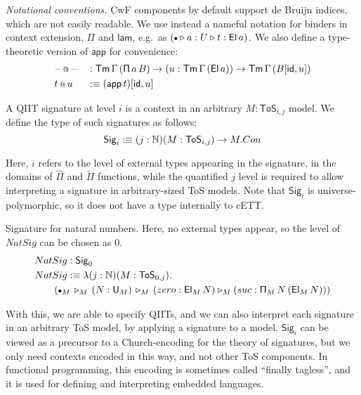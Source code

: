 \documentclass{llncs}
\makeatletter
\newcommand{\ToS}{\mathsf{ToS}}
\newcommand{\ext}{\triangleright}
\newcommand{\emptycon}{\scaleobj{.75}\bullet}
\newcommand{\Pii}{\mathsf{\Pi}}
\newcommand{\appi}{\mathsf{app}}
\newcommand{\lami}{\mathsf{lam}}
\newcommand{\Pie}{\mathsf{\hat{\Pi}}}
\newcommand{\Piinf}{\mathsf{\tilde{\Pi}}}
\newcommand{\appitt}{\mathop{{\scriptstyle @}}}
\newcommand{\Sig}{\mathsf{Sig}}
\makeatother
\begin{document}
\emph{Notational conventions.} CwF components by default support de Bruijn
indices, which are not easily readable. We use instead a nameful notation for
binders in context extension, $\Pii$ and $\lami$, e.g.\ as $(\emptycon \ext a :
U \ext t : \El\,a)$. We also define a type-theoretic version of $\appi$ for
convenience:
\begin{alignat*}{3}
  & \blank\appitt\blank && :
      \Tm\,\Gamma\,(\Pii\,a\,B)\ra
      (u : \Tm\,\Gamma\,(\El\,a)) \ra \Tm\,\Gamma\,(B[\id, u])\\
  & t\appitt u && :\equiv (\appi\,t)[\id, u]
\end{alignat*}

\begin{nidefinition}
A QIIT signature at level $i$ is a context in an arbitrary $M : \ToS_{i,j}$
model. We define the type of such signatures as follows:
\[
  \Sig_i :\equiv (j : \mathbb{N})(M : \ToS_{i,j})\ra M.Con
\]

Here, $i$ refers to the level of external types appearing in the signature, in
the domains of $\Pie$ and $\Piinf$ functions, while the quantified $j$ level is
required to allow interpreting a signature in arbitrary-sized ToS models. Note
that $\Sig_i$ is universe-polymorphic, so it does not have a type internally to
cETT.

\begin{example}{
    Signature for natural numbers. Here, no external types appear, so the level
    of $NatSig$ can be chosen as $0$.}
\begin{alignat*}{3}
  & NatSig : \Sig_0 \\
  & NatSig :\equiv \lambda (j :\mathbb{N})(M : \ToS_{0,j}).\\
  & \hspace{2em}(\emptycon_M\,\ext_M\, (N : \U_M) \,\ext_M\, (zero : \El_M\,N) \ext_M (suc : \Pii_M\,N\,(\El_M\,N)))
\end{alignat*}
\end{example}

With this, we are able to specify QIITs, and we can also interpret each
signature in an arbitrary ToS model, by applying a signature to a model.
$\Sig_i$ can be viewed as a precursor to a Church-encoding for the theory of
signatures, but we only need contexts encoded in this way, and not other ToS
components. In functional programming, this encoding is sometimes called
``finally tagless''\cite{TODO}, and it is used for defining and interpreting
embedded languages.
\end{nidefinition}
\end{document}
